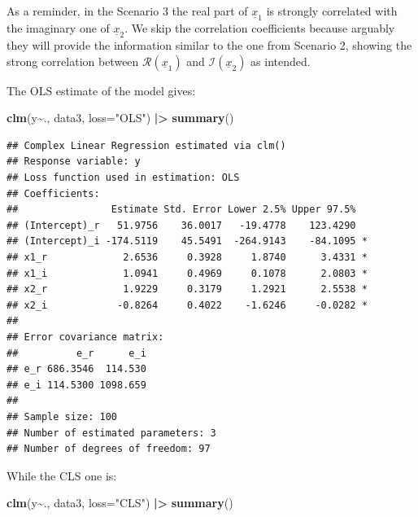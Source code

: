 \documentclass[
]{book}
\newenvironment{Shaded}{\begin{snugshade}}{\end{snugshade}}
\newcommand{\DataTypeTok}[1]{\textcolor[rgb]{0.13,0.29,0.53}{#1}}
\newcommand{\ErrorTok}[1]{\textcolor[rgb]{0.64,0.00,0.00}{\textbf{#1}}}
\newcommand{\KeywordTok}[1]{\textcolor[rgb]{0.13,0.29,0.53}{\textbf{#1}}}
\newcommand{\NormalTok}[1]{#1}
\newcommand{\OperatorTok}[1]{\textcolor[rgb]{0.81,0.36,0.00}{\textbf{#1}}}
\newcommand{\StringTok}[1]{\textcolor[rgb]{0.31,0.60,0.02}{#1}}
\begin{document}
As a reminder, in the Scenario 3 the real part of \(\underline{x}_{1}\) is strongly correlated with the imaginary one of \(\underline{x}_{2}\). We skip the correlation coefficients because arguably they will provide the information similar to the one from Scenario 2, showing the strong correlation between \(\mathcal{R}\left(\underline{x}_{1}\right)\) and \(\mathcal{I}\left(\underline{x}_{2}\right)\) as intended.

The OLS estimate of the model gives:

\begin{Shaded}
\begin{Highlighting}[]
\KeywordTok{clm}\NormalTok{(y}\OperatorTok{\textasciitilde{}}\NormalTok{., data3, }\DataTypeTok{loss=}\StringTok{"OLS"}\NormalTok{) }\OperatorTok{|}\ErrorTok{\textgreater{}}
\StringTok{    }\KeywordTok{summary}\NormalTok{()}
\end{Highlighting}
\end{Shaded}

\begin{verbatim}
## Complex Linear Regression estimated via clm()
## Response variable: y
## Loss function used in estimation: OLS
## Coefficients:
##                Estimate Std. Error Lower 2.5% Upper 97.5%  
## (Intercept)_r   51.9756    36.0017   -19.4778    123.4290  
## (Intercept)_i -174.5119    45.5491  -264.9143    -84.1095 *
## x1_r             2.6536     0.3928     1.8740      3.4331 *
## x1_i             1.0941     0.4969     0.1078      2.0803 *
## x2_r             1.9229     0.3179     1.2921      2.5538 *
## x2_i            -0.8264     0.4022    -1.6246     -0.0282 *
## 
## Error covariance matrix:
##          e_r      e_i
## e_r 686.3546  114.530
## e_i 114.5300 1098.659
## 
## Sample size: 100
## Number of estimated parameters: 3
## Number of degrees of freedom: 97
\end{verbatim}

While the CLS one is:

\begin{Shaded}
\begin{Highlighting}[]
\KeywordTok{clm}\NormalTok{(y}\OperatorTok{\textasciitilde{}}\NormalTok{., data3, }\DataTypeTok{loss=}\StringTok{"CLS"}\NormalTok{) }\OperatorTok{|}\ErrorTok{\textgreater{}}
\StringTok{    }\KeywordTok{summary}\NormalTok{()}
\end{Highlighting}
\end{Shaded}
\end{document}

